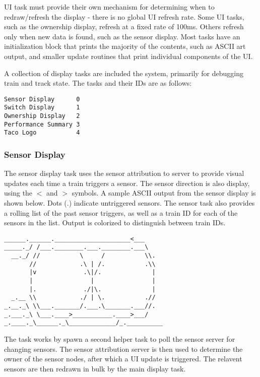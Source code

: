 \documentclass[twoside,a4paper]{refart}
\begin{document}
UI task must provide their own mechanism for determining when to redraw/refresh the display - there is no global UI refresh rate. Some UI tasks, such as the ownership display, refresh at a fixed rate of 100ms. Others refresh only when new data is found, such as the sensor display. Most tasks have an initialization block that prints the majority of the contents, such as ASCII art output, and smaller update routines that print individual components of the UI.

A collection of display tasks are included the system, primarily for debugging train and track state. The tasks and their IDs are as follows:
\begin{verbatim}
Sensor Display      0
Switch Display      1
Ownership Display   2
Performance Summary 3
Taco Logo           4
\end{verbatim}
\subsubsection{Sensor Display}

The sensor display task uses the sensor attribution to server to provide visual updates each time a train triggers a sensor. The sensor direction is also display, using the $<$ and $>$ symbols. A sample ASCII output from the sensor display is shown below. Dots ($.$) indicate untriggered sensors. The sensor task also provides a rolling list of the past sensor triggers, as well as a train ID for each of the sensors in the list. Output is colorized to distinguish between train IDs.

\begin{verbatim}
______.______._____________________<___    
_____._/ /___.________.___.________.___\ 
  __._/ //           \     /           \\.
       //            .\ | /.           .\\ 
       |v             .\|/.              |  
       |                |                |   
       |.             ./|\.              |   
  _.__ \\            ./ | \.           .// 
_.__._\ \\___._______/.___.\_______.___//.
_.___._\ \___.____>___________.____>___/  
_.____._\______._\_____________/_.__________
\end{verbatim}

The task works by spawn a second helper task to poll the sensor server for changing sensors. The sensor attribution server is then used to determine the owner of the sensor nodes, after which a UI update is triggered. The relavent sensors are then redrawn in bulk by the main display task.
\end{document}
